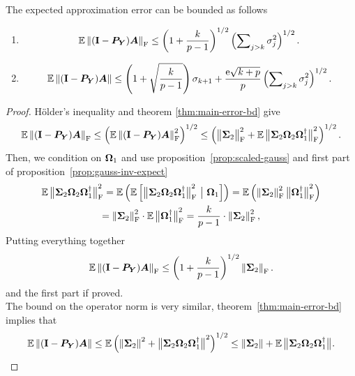 \begin{theorem} \label{thm:avg-frob-error-gauss}
The expected approximation error can be bounded as follows
\begin{enumerate}
  \item
$$
\Expect \fnorm{(\Id - \mtx{P}_{\mtx{Y}}) \mtx{A}}
    \leq \left( 1 + \frac{k}{p-1} \right)^{1/2}
    \left( \sum\nolimits_{j>k} \sigma_j^2 \right)^{1/2}.
$$
\item 
$$
\Expect \norm{(\Id - \mtx{P}_{\mtx{Y}}) \mtx{A}}
    \leq \left(1 + \sqrt{\frac{k}{p-1}} \right) \sigma_{k+1}
        + \frac{\econst\sqrt{k+p}}{p}
        \left(\sum\nolimits_{j>k} \sigma_{j}^2 \right)^{1/2}.
$$
 \end{enumerate}
\end{theorem}
\begin{proof}
H{\"o}lder's inequality and theorem \ref{thm:main-error-bd} give 
$$
\Expect \fnorm{ (\Id - \mtx{P}_{\mtx{Y}}) \mtx{A}}
    \leq \left( \Expect \fnormsq{(\Id - \mtx{P}_{\mtx{Y}}) \mtx{A}} \right)^{1/2}
    \leq \left( \smnorm{\rm F}{\mtx{\Sigma}_2}^2 + \Expect \smnorm{\rm F}{ \mtx{\Sigma}_2
                \mtx{\Omega}_2 \mtx{\Omega}_1^\psinv }^2 \right)^{1/2}.
$$
Then, we condition on $\mtx{\Omega}_1$ and use proposition~\ref{prop:scaled-gauss}
and first part of proposition~\ref{prop:gauss-inv-expect}
\begin{multline*}
\Expect \smnorm{\rm F}{ \mtx{\Sigma}_2 \mtx{\Omega}_2 \mtx{\Omega}_1^\psinv }^2
    = \Expect \left( \Expect \left[ \smnorm{\rm F}{ \mtx{\Sigma}_2 \mtx{\Omega}_2
\mtx{\Omega}_1^\psinv }^2 \ \big\vert \ \mtx{\Omega}_1 \right] \right)
    = \Expect \left( \fnormsq{\mtx{\Sigma}_2} \smnorm{\rm F}{\mtx{\Omega}_1^\psinv}^2 \right) \\
    = \fnormsq{\mtx{\Sigma}_2} \cdot \Expect \smnorm{\rm F}{\mtx{\Omega}_1^\psinv}^2
    = \frac{k}{p-1} \cdot \fnormsq{\mtx{\Sigma}_2},
\end{multline*}
Putting everything together
$$
\Expect \fnorm{ (\Id - \mtx{P}_{\mtx{Y}}) \mtx{A}}
    \leq \left(1 + \frac{k}{p-1}\right)^{1/2} \fnorm{ \mtx{\Sigma}_2 }.
$$
and the first part if proved. \\
The bound on the operator norm is very similar, theorem~\ref{thm:main-error-bd}
implies that
$$
\Expect \norm{ (\Id - \mtx{P}_{\mtx{Y}}) \mtx{A} }
    \leq \Expect \left( \normsq{\mtx{\Sigma}_2}
        + \smnorm{}{\mtx{\Sigma}_2 \mtx{\Omega}_2 \mtx{\Omega}_1^\psinv }^2 \right)^{1/2}
    \leq \norm{\mtx{\Sigma}_2} + \Expect \smnorm{}{ \mtx{\Sigma}_2 \mtx{\Omega}_2 \mtx{\Omega}_1^\psinv }.
$$
\end{proof}
